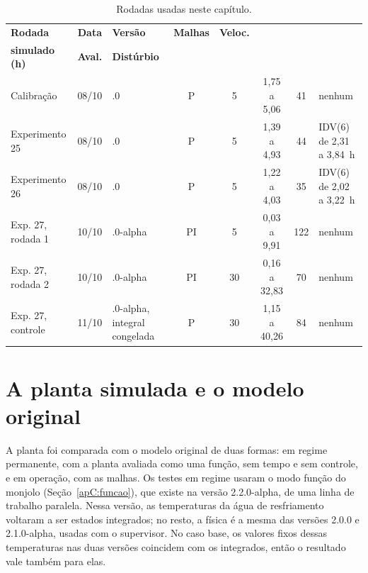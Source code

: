 \begin{table}[htbp]
	\centering
	\caption{Rodadas usadas neste capítulo.}
	\label{tab:rodadas}
	\scriptsize
	\begin{tabular}{|>{\raggedright\arraybackslash}p{}|c|>{\raggedright\arraybackslash}p{}|c|c|c|c|>{\raggedright\arraybackslash}p{}|}
		\hline
		\textbf{Rodada} & \textbf{Data} & \textbf{Versão} & \textbf{Malhas} & \textbf{Veloc.} & \cabecalho{\textbf{Tempo}\\\textbf{simulado (h)}} & \textbf{Aval.} & \textbf{Distúrbio} \\
		\hline
		Calibração & 08/10 & 2.0.0 & P & 5 & 1,75 a 5,06 & 41 & nenhum \\
		Experimento 25 & 08/10 & 2.0.0 & P & 5 & 1,39 a 4,93 & 44 & IDV(6) de 2,31 a 3,84~h \\
		Experimento 26 & 08/10 & 2.0.0 & P & 5 & 1,22 a 4,03 & 35 & IDV(6) de 2,02 a 3,22~h \\
		Exp. 27, rodada 1 & 10/10 & 2.1.0-alpha & PI & 5 & 0,03 a 9,91 & 122 & nenhum \\
		Exp. 27, rodada 2 & 10/10 & 2.1.0-alpha & PI & 30 & 0,16 a 32,83 & 70 & nenhum \\
		Exp. 27, controle & 11/10 & 2.1.0-alpha, integral congelada & P & 30 & 1,15 a 40,26 & 84 & nenhum \\
		\hline
	\end{tabular}
\end{table}

\FloatBarrier
\section{A planta simulada e o modelo original}
\label{sec:validacao}

A planta foi comparada com o modelo original de duas formas: em regime permanente, com a planta avaliada como uma função, sem tempo e sem controle, e em operação, com as malhas. Os testes em regime usaram o modo função do monjolo (Seção~\ref{apC:funcao}), que existe na versão 2.2.0-alpha, de uma linha de trabalho paralela. Nessa versão, as temperaturas da água de resfriamento voltaram a ser estados integrados; no resto, a física é a mesma das versões 2.0.0 e 2.1.0-alpha, usadas com o supervisor. No caso base, os valores fixos dessas temperaturas nas duas versões coincidem com os integrados, então o resultado vale também para elas.

